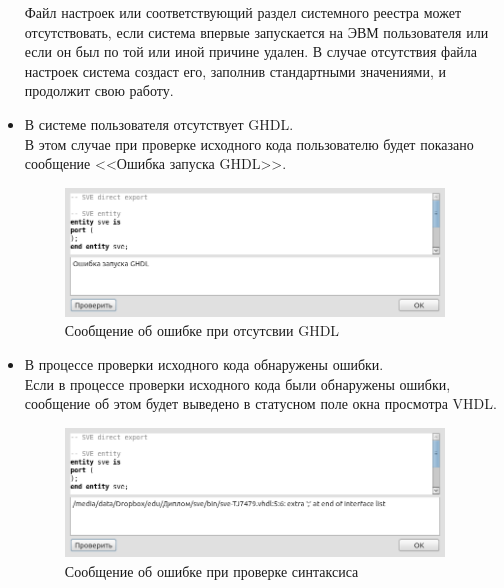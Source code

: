 \begin{itemize}
  Файл настроек или соответствующий раздел системного реестра может отсутствовать, если система впервые запускается на ЭВМ пользователя или если он был по той или иной причине удален.
  В случае отсутствия файла настроек система создаст его, заполнив стандартными значениями, и продолжит свою работу.
  \item В системе пользователя отсутствует GHDL.\\
  В этом случае при проверке исходного кода пользователю будет показано сообщение <<Ошибка запуска GHDL>>.
  \begin{figure}[H]
    \centering
    \includegraphics[width=0.95\textwidth]{gui/errors/ghdl.png}
    \caption{Сообщение об ошибке при отсутсвии GHDL}
  \end{figure}
  \item В процессе проверки исходного кода обнаружены ошибки.\\
  Если в процессе проверки исходного кода были обнаружены ошибки, сообщение об этом будет выведено в статусном поле окна просмотра VHDL.
  \begin{figure}[H]
    \centering
    \includegraphics[width=0.95\textwidth]{gui/errors/vhdl.png}
    \caption{Сообщение об ошибке при проверке синтаксиса}
  \end{figure}
\end{itemize}